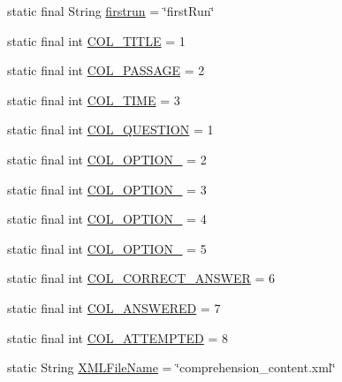 \begin{DoxyCompactItemize}
\item 
static final String \hyperlink{classorg_1_1buildmlearn_1_1toolkit_1_1comprehensiontemplate_1_1Constants_a6fbb10848c407bcb8fc5e8eb86f74613}{firstrun} = \char`\"{}first\+Run\char`\"{}
\item 
static final int \hyperlink{classorg_1_1buildmlearn_1_1toolkit_1_1comprehensiontemplate_1_1Constants_ab0c6c7fb3aa6b519cf104c730e977ce1}{C\+O\+L\+\_\+\+T\+I\+T\+LE} = 1
\item 
static final int \hyperlink{classorg_1_1buildmlearn_1_1toolkit_1_1comprehensiontemplate_1_1Constants_a4892b25d13c18d6e0c61ec349e0d14b6}{C\+O\+L\+\_\+\+P\+A\+S\+S\+A\+GE} = 2
\item 
static final int \hyperlink{classorg_1_1buildmlearn_1_1toolkit_1_1comprehensiontemplate_1_1Constants_a89fb7ecf7329763dc274da9c1e8cde48}{C\+O\+L\+\_\+\+T\+I\+ME} = 3
\item 
static final int \hyperlink{classorg_1_1buildmlearn_1_1toolkit_1_1comprehensiontemplate_1_1Constants_a74157f9ea123eddfb1b6578bbca42d41}{C\+O\+L\+\_\+\+Q\+U\+E\+S\+T\+I\+ON} = 1
\item 
static final int \hyperlink{classorg_1_1buildmlearn_1_1toolkit_1_1comprehensiontemplate_1_1Constants_a74213721c184e9e965de811c882be1a7}{C\+O\+L\+\_\+\+O\+P\+T\+I\+O\+N\+\_} = 2
\item 
static final int \hyperlink{classorg_1_1buildmlearn_1_1toolkit_1_1comprehensiontemplate_1_1Constants_ae2fffd3e048b07f57349ed600b4f6c97}{C\+O\+L\+\_\+\+O\+P\+T\+I\+O\+N\+\_} = 3
\item 
static final int \hyperlink{classorg_1_1buildmlearn_1_1toolkit_1_1comprehensiontemplate_1_1Constants_a4ce0a1eb0b4cb075861090a0d2e1ee7d}{C\+O\+L\+\_\+\+O\+P\+T\+I\+O\+N\+\_} = 4
\item 
static final int \hyperlink{classorg_1_1buildmlearn_1_1toolkit_1_1comprehensiontemplate_1_1Constants_af9dd5a62672ada95d65a1cae9b5f3a9a}{C\+O\+L\+\_\+\+O\+P\+T\+I\+O\+N\+\_} = 5
\item 
static final int \hyperlink{classorg_1_1buildmlearn_1_1toolkit_1_1comprehensiontemplate_1_1Constants_ad46c20013bc4235910335dc008308bc4}{C\+O\+L\+\_\+\+C\+O\+R\+R\+E\+C\+T\+\_\+\+A\+N\+S\+W\+ER} = 6
\item 
static final int \hyperlink{classorg_1_1buildmlearn_1_1toolkit_1_1comprehensiontemplate_1_1Constants_aed64da3d90b514a831a427f571ba5c5a}{C\+O\+L\+\_\+\+A\+N\+S\+W\+E\+R\+ED} = 7
\item 
static final int \hyperlink{classorg_1_1buildmlearn_1_1toolkit_1_1comprehensiontemplate_1_1Constants_a930743c47140cc8b4542c0c2672b963b}{C\+O\+L\+\_\+\+A\+T\+T\+E\+M\+P\+T\+ED} = 8
\item 
static String \hyperlink{classorg_1_1buildmlearn_1_1toolkit_1_1comprehensiontemplate_1_1Constants_a17fc58f4be131d0dc62f53e01b3ca060}{X\+M\+L\+File\+Name} = \char`\"{}comprehension\+\_\+content.\+xml\char`\"{}
\end{DoxyCompactItemize}


